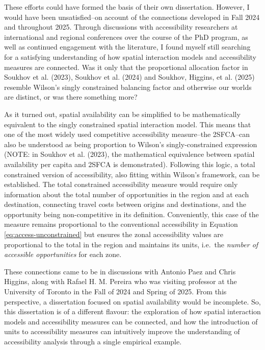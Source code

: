 \documentclass[
11pt, %
oneside, %
english, %
singlespacing, %
]{macthesis} %
\begin{document}
These efforts could have formed the basis of their own dissertation. However, I would have been unsatisfied--on account of the connections developed in Fall 2024 and throughout 2025. Through discussions with accessibility researchers at international and regional conferences over the course of the PhD program, as well as continued engagement with the literature, I found myself still searching for a satisfying understanding of how spatial interaction models and accessibility measures are connected. Was it only that the proportional allocation factor in Soukhov et al. (2023), Soukhov et al. (2024) and Soukhov, Higgins, et al. (2025) resemble Wilson's singly constrained balancing factor and otherwise our worlds are distinct, or was there something more?

As it turned out, spatial availability can be simplified to be mathematically equivalent to the singly constrained spatial interaction model. This means that one of the most widely used competitive accessibility measure--the 2SFCA--can also be understood as being proportion to Wilson's singly-constrained expression (NOTE: in Soukhov et al. (2023), the mathematical equivalence between spatial availability per capita and 2SFCA is demonstrated). Following this logic, a total constrained version of accessibility, also fitting within Wilson's framework, can be established. The total constrained accessibility measure would require only information about the total number of opportunities in the region and at each destination, connecting travel costs between origins and destinations, and the opportunity being non-competitive in its definition. Conveniently, this case of the measure remains proportional to the conventional accessibility in Equation \ref{eq:access-unconstrained} but ensures the zonal accessibility values are proportional to the total in the region and maintains its units, i.e.~the \emph{number of accessible opportunities} for each zone.

These connections came to be in discussions with Antonio Paez and Chris Higgins, along with Rafael H. M. Pereira who was visiting professor at the University of Toronto in the Fall of 2024 and Spring of 2025. From this perspective, a dissertation focused on spatial availability would be incomplete. So, this dissertation is of a different flavour: the exploration of how spatial interaction models and accessibility measures can be connected, and how the introduction of units to accessibility measures can intuitively improve the understanding of accessibility analysis through a single empirical example.
\end{document}
